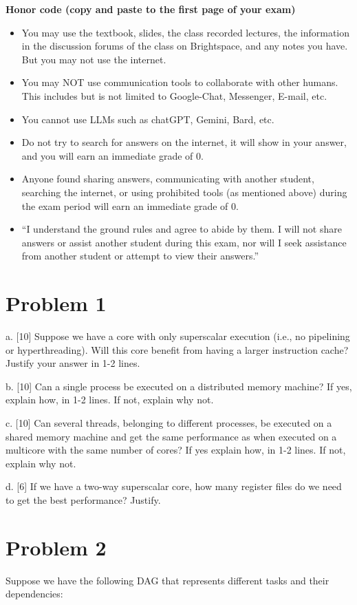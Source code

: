\documentclass{article}
\begin{document}
\textbf{Honor code (copy and paste to the first page of your exam)}
\begin{itemize}
    \item You may use the textbook, slides, the class recorded lectures, the information in the discussion forums of the class on Brightspace, and any notes you have. But you may not use the internet.
    \item You may NOT use communication tools to collaborate with other humans. This includes but is not limited to Google-Chat, Messenger, E-mail, etc.
    \item You cannot use LLMs such as chatGPT, Gemini, Bard, etc.
    \item Do not try to search for answers on the internet, it will show in your answer, and you will earn an immediate grade of 0.
    \item Anyone found sharing answers, communicating with another student, searching the internet, or using prohibited tools (as mentioned above) during the exam period will earn an immediate grade of 0.
    \item “I understand the ground rules and agree to abide by them. I will not share answers or assist another student during this exam, nor will I seek assistance from another student or attempt to view their answers.”
\end{itemize}

\section*{Problem 1}
a. [10]  Suppose we have a core with only superscalar execution (i.e., no pipelining or hyperthreading). Will this core benefit from having a larger instruction cache? Justify your answer in 1-2 lines.

b. [10] Can a single process be executed on a distributed memory machine? If yes, explain how, in 1-2 lines. If not, explain why not.

c. [10] Can several threads, belonging to different processes, be executed on a shared memory machine and get the same performance as when executed on a multicore with the same number of cores? If yes explain how, in 1-2 lines. If not, explain why not.

d. [6] If we have a two-way superscalar core, how many register files do we need to get the best performance? Justify.


\section*{Problem 2}
Suppose we have the following DAG that represents different tasks and their dependencies:
\end{document}
